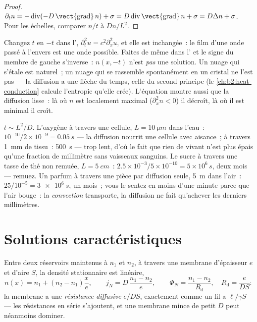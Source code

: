 \begin{proof}
$\partial_t n = -\operatorname{div}(-D\,\vect{\operatorname{grad}}\,n) +
\sigma = D\operatorname{div}\vect{\operatorname{grad}}\,n + \sigma = D\Delta
n + \sigma$. Pour les échelles, comparer $n/t$ à $Dn/L^2$.
\end{proof}

\begin{remark}\label{rem:b2:particle-diffusion:irreversible}
Changez $t$ en $-t$ dans l', $\partial_t^2 u = c^2
\partial_x^2 u$, et elle est inchangée~: le film d'une onde passé à l'envers est
une onde possible. Faites de même dans l' et le signe du
membre de gauche s'inverse~: $n(x,-t)$ n'est \emph{pas} une solution. Un nuage qui
s'étale est naturel~; un nuage qui se rassemble spontanément en un cristal
ne l'est pas --- la diffusion a une flèche du temps, celle du second principe
(le \cref{ch:b2:heat-conduction} calcule l'entropie qu'elle crée).
L'équation montre aussi que la diffusion lisse~: là où $n$ est localement
maximal ($\partial_x^2 n < 0$) il décroît, là où il est minimal il
croît.
\end{remark}

\begin{example}\label{ex:b2:particle-diffusion:times}
$t \sim L^2/D$. L'oxygène à travers une cellule, $L = \qty{10}{\micro m}$ dans l'eau~:
$10^{-10}/2 \times 10^{-9} = \qty{0.05}{s}$ --- la diffusion nourrit une cellule avec
aisance~; à travers \qty{1}{mm} de tissu~: \qty{500}{s} --- trop lent, d'où le fait que
rien de vivant n'est plus épais qu'une fraction de millimètre sans
vaisseaux sanguins. Le sucre à travers une tasse de thé non remuée, $L = \qty{5}{cm}$~:
$2.5 \times 10^{-3}/5 \times 10^{-10} = 5 \times 10^6\,\unit{s}$, deux mois
--- remuez. Un parfum à travers une pièce par diffusion seule, \qty{5}{m} dans
l'air~: $25/10^{-5} = \qty{3e6}{s}$, un mois~; vous le sentez en moins d'une minute
parce que l'air bouge~: la \emph{convection} transporte, la diffusion ne
fait qu'achever les derniers millimètres.
\end{example}

\section{Solutions caractéristiques}

\begin{proposition}\label{prop:b2:particle-diffusion:membrane}
Entre deux réservoirs maintenus à $n_1$ et $n_2$, à travers une membrane
d'épaisseur $e$ et d'aire $S$, la densité stationnaire est linéaire,
\[
n(x) = n_1 + (n_2 - n_1)\frac{x}{e}, \qquad
j_N = D\,\frac{n_1 - n_2}{e}, \qquad
\Phi_N = \frac{n_1 - n_2}{R_{\text{d}}}, \quad R_{\text{d}} = \frac{e}{DS}:
\]
la membrane a une \emph{résistance diffusive} $e/DS$, exactement comme un fil
a $\ell/\gamma S$ --- les résistances en série s'ajoutent, et une membrane mince
de petit $D$ peut néanmoins dominer.
\end{proposition}

